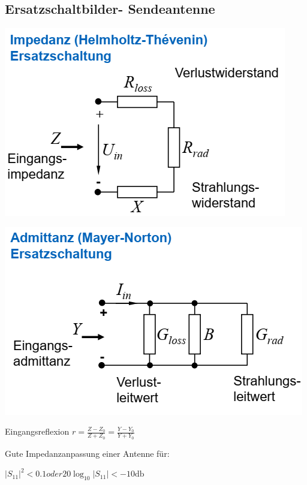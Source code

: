 \documentclass[english]{latex4ei/latex4ei_sheet}
\begin{document}
\begin{sectionbox}
\subsection{Ersatzschaltbilder- Sendeantenne}
\includegraphics[width = \textwidth]{./img/antenne_sende_ersatz.png}

\includegraphics[width = \textwidth]{./img/antenne_sende_ersatz_02.png}


Eingangsreflexion
$r = \frac{Z - Z_0}{Z + Z_0} = \frac{Y - Y_0}{Y + Y_0}$

Gute Impedanzanpassung einer Antenne für:

$|S_{11}|^2 < 0.1$$ oder $$20\log_{10} |S_{11}| < -10\text{db}$

\end{sectionbox}
\end{document}
